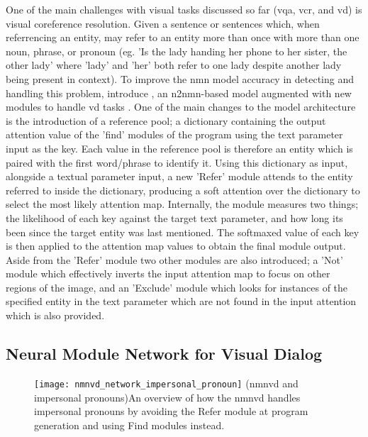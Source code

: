 One of the main challenges with visual tasks discussed so far (\gls{vqa}, \gls{vcr}, and \gls{vd}) is visual coreference resolution.
Given a sentence or sentences which, when referrencing an entity, may refer to an entity more than once with more than one noun, phrase, or pronoun (eg. 'Is the lady handing her phone to her sister, the other lady' where 'lady' and 'her' both refer to one lady despite another lady being present in context).
To improve the \gls{nmn} model accuracy in detecting and handling this problem, \citeauthor{kottur_visual_2018} introduce , an \gls{n2nmn}-based model augmented with new modules to handle \gls{vd} tasks \cite{kottur_visual_2018}.
One of the main changes to the model architecture is the introduction of a reference pool; a dictionary containing the output attention value of the 'find' modules of the program using the text parameter input as the key.
Each value in the reference pool is therefore an entity which is paired with the first word/phrase to identify it.
Using this dictionary as input, alongside a textual parameter input, a new 'Refer' module attends to the entity referred to inside the dictionary, producing a soft attention over the dictionary to select the most likely attention map.
Internally, the module measures two things; the likelihood of each key against the target text parameter, and how long its been since the target entity was last mentioned.
The softmaxed value of each key is then applied to the attention map values to obtain the final module output.
Aside from the 'Refer' module two other modules are also introduced; a 'Not' module which effectively inverts the input attention map to focus on other regions of the image, and an 'Exclude' module which looks for instances of the specified entity in the text parameter which are not found in the input attention which is also provided.

\subsection{Neural Module Network for Visual Dialog}
\label{subsec:neural_module_network_for_visual_dialog}

\begin{figure}[htbp]
    \centering
    \texttt{[image: nmnvd\_network\_impersonal\_pronoun]}
    \captionsource(\acrshort{nmnvd} and impersonal pronouns){An overview of how the \acrshort{nmnvd} handles impersonal pronouns by avoiding the Refer module at program generation and using Find modules instead. \label{fig:nmnvd_network_impersonal_pronoun}}{\citeauthor{cho_visual_2021}\cite{cho_visual_2021}}
\end{figure}

